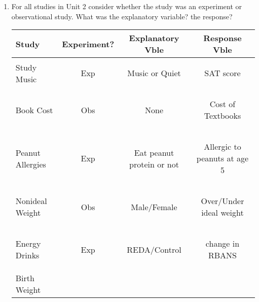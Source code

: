   \begin{enumerate}
  \item For all studies in Unit 2 consider whether the study was an
    experiment or observational study.  What was the explanatory
    variable? the response?\\
 \begin{tabular}{|l|c|c|c|}\hline
Study&Experiment?&Explanatory Vble&Response Vble\\ \hline
Study Music &
\begin{key}
  Exp
\end{key}
&
\begin{key}
  Music or Quiet
\end{key}
&
\begin{key}
  SAT score
\end{key}
\\ \hline
Book Cost &
\begin{key}
  Obs
\end{key}
&
\begin{key}
  None
\end{key}
&
\begin{key}
  Cost of Textbooks
\end{key}
\\ \hline
Peanut Allergies &
\begin{key}
  Exp
\end{key}
&
\begin{key}
  Eat peanut protein or not
\end{key}
&
\begin{key}
  Allergic to peanuts at age 5
\end{key}
\\ \hline
Nonideal Weight &
\begin{key}
  Obs
\end{key}
&
\begin{key}
  Male/Female
\end{key}
&
\begin{key}
  Over/Under ideal weight
\end{key}
\\ \hline
Energy Drinks &
\begin{key}
  Exp
\end{key}
&
\begin{key}
  REDA/Control
\end{key}
&
\begin{key}
  change in RBANS
\end{key}
\\ \hline
Birth Weight &
\begin{key}

\end{key}
\end{tabular}
\end{enumerate}
